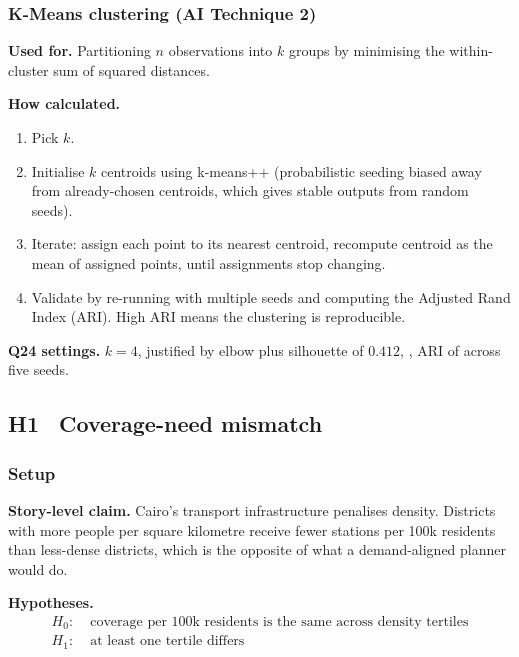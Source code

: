 \subsubsection{K-Means clustering (AI Technique 2)}

\textbf{Used for.} Partitioning $n$ observations into $k$ groups by
minimising the within-cluster sum of squared distances.

\textbf{How calculated.}
\begin{enumerate}
 \item Pick $k$.
 \item Initialise $k$ centroids using k-means++ (probabilistic seeding
 biased away from already-chosen centroids, which gives stable
 outputs from random seeds).
 \item Iterate: assign each point to its nearest centroid, recompute
 centroid as the mean of assigned points, until assignments
 stop changing.
 \item Validate by re-running with multiple seeds and computing the
 Adjusted Rand Index (ARI). High ARI means the clustering is
 reproducible.
\end{enumerate}

\textbf{Q24 settings.} $k = 4$, justified by elbow plus silhouette
of $0.412$, , ARI of  across five seeds.

\subsection{H1 \textbullet\ Coverage-need mismatch}
\label{sec:h1}

\subsubsection{Setup}

\textbf{Story-level claim.} Cairo's transport infrastructure penalises
density. Districts with more people per square kilometre receive fewer
stations per 100k residents than less-dense districts, which is the
opposite of what a demand-aligned planner would do.

\textbf{Hypotheses.}
\begin{align*}
 H_0:\;& \text{coverage per 100k residents is the same across density tertiles} \\
 H_1:\;& \text{at least one tertile differs}
\end{align*}

